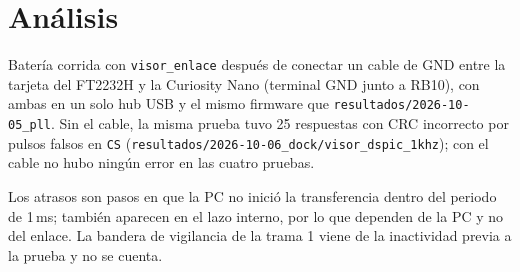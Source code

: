 \section{Análisis}

Batería corrida con \texttt{visor\_enlace} después de conectar un cable de
GND entre la tarjeta del FT2232H y la Curiosity Nano (terminal GND junto a
RB10), con ambas en un solo hub USB y el mismo firmware que
\texttt{resultados/2026-10-05\_pll}. Sin el cable, la misma prueba tuvo 25
respuestas con CRC incorrecto por pulsos falsos en \texttt{CS}
(\texttt{resultados/2026-10-06\_dock/visor\_dspic\_1khz}); con el cable no
hubo ningún error en las cuatro pruebas.

Los atrasos son pasos en que la PC no inició la transferencia dentro del
periodo de 1\,ms; también aparecen en el lazo interno, por lo que dependen
de la PC y no del enlace. La bandera de vigilancia de la trama 1 viene de la
inactividad previa a la prueba y no se cuenta.
